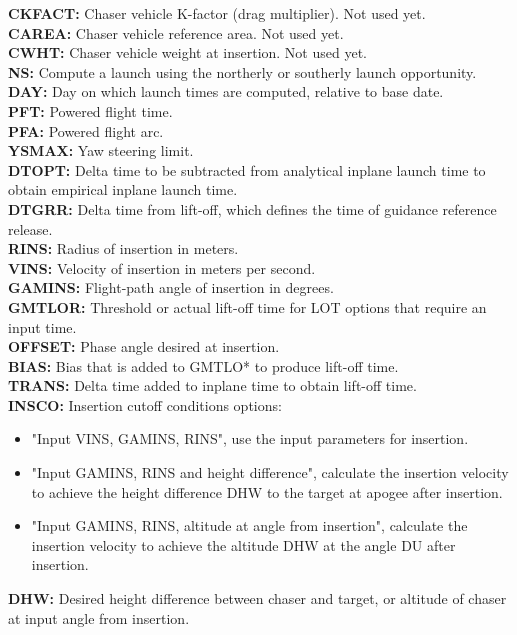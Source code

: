 \documentclass[11pt]{article} %
\begin{document}
\textbf{CKFACT:} Chaser vehicle K-factor (drag multiplier). Not used yet.\\
\textbf{CAREA:} Chaser vehicle reference area. Not used yet.\\
\textbf{CWHT:} Chaser vehicle weight at insertion. Not used yet.\\
\textbf{NS:} Compute a launch using the northerly or southerly launch opportunity.\\
\textbf{DAY:} Day on which launch times are computed, relative to base date.\\
\textbf{PFT:} Powered flight time.\\
\textbf{PFA:} Powered flight arc.\\
\textbf{YSMAX:} Yaw steering limit.\\
\textbf{DTOPT:} Delta time to be subtracted from analytical inplane launch time to obtain empirical inplane launch time.\\
\textbf{DTGRR:} Delta time from lift-off, which defines the time of guidance reference release.\\
\textbf{RINS:} Radius of insertion in meters.\\
\textbf{VINS:} Velocity of insertion in meters per second.\\
\textbf{GAMINS:} Flight-path angle of insertion in degrees.\\
\textbf{GMTLOR:} Threshold or actual lift-off time for LOT options that require an input time.\\
\textbf{OFFSET:} Phase angle desired at insertion.\\
\textbf{BIAS:} Bias that is added to GMTLO* to produce lift-off time.\\
\textbf{TRANS:} Delta time added to inplane time to obtain lift-off time.\\
\textbf{INSCO:} Insertion cutoff conditions options:
\begin{itemize}
\item{"Input VINS, GAMINS, RINS", use the input parameters for insertion.}
\item{"Input GAMINS, RINS and height difference", calculate the insertion velocity to achieve the height difference DHW to the target at apogee after insertion.}
\item{"Input GAMINS, RINS, altitude at angle from insertion", calculate the insertion velocity to achieve the altitude DHW at the angle DU after insertion.}
\end{itemize}
\textbf{DHW:} Desired height difference between chaser and target, or altitude of chaser at input angle from insertion.\\
\end{document}
